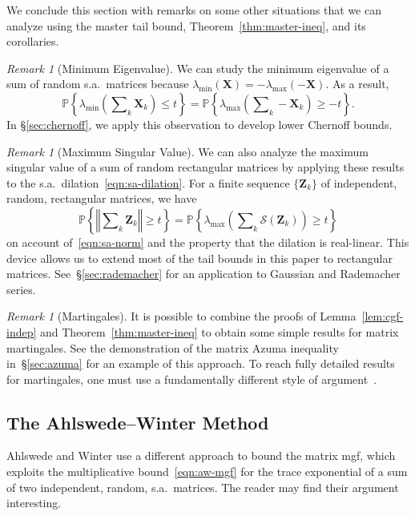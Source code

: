 \documentclass[11pt,letterpaper,twoside,reqno,draft]{amsart}
\theoremstyle{remark}
\newtheorem{rem}[thm]{Remark}
\numberwithin{equation}{section}
\numberwithin{thm}{section}
\begin{document}
We conclude this section with remarks on some other situations that we can analyze using the master tail bound, Theorem~\ref{thm:master-ineq}, and its corollaries.

\begin{rem}[Minimum Eigenvalue]
We can study the minimum eigenvalue of a sum of random s.a.~matrices because
$
\lambda_{\min}({\bm{{X}}})
	= - \lambda_{\max}(-{\bm{{X}}}).
$
As a result,
$$
{\mathbb{P}\left\{ {{ \lambda_{\min}\left(\sum\nolimits_k {\bm{{X}}}_k \right) \leq t }} \right\}}
	= {\mathbb{P}\left\{ {{ \lambda_{\max}\left(\sum\nolimits_k -{\bm{{X}}}_k \right) \geq -t }} \right\}}.
$$
In \S\ref{sec:chernoff}, we apply this observation to develop lower Chernoff bounds.
\end{rem}

\begin{rem}[Maximum Singular Value] \label{rem:max-sing}
We can also analyze the maximum singular value of a sum of random rectangular matrices by applying these results to the s.a.~dilation~\eqref{eqn:sa-dilation}.  For a finite sequence $\{{\bm{{Z}}}_k\}$ of independent, random, rectangular matrices, we have
$$
{\mathbb{P}\left\{ {{ {\left\Vert {{ \sum\nolimits_k {\bm{{Z}}}_k }} \right\Vert} \geq t }} \right\}}
	= {\mathbb{P}\left\{ {{ \lambda_{\max}\left(\sum\nolimits_k {\mathscr{{S}}}({\bm{{Z}}}_k) \right) \geq t }} \right\}}
$$
on account of~\eqref{eqn:sa-norm} and the property that the dilation is real-linear.
This device allows us to extend most of the tail bounds in this paper to rectangular matrices.  See~\S\ref{sec:rademacher} for an application to Gaussian and Rademacher series.
\end{rem}

\begin{rem}[Martingales]
It is possible to combine the proofs of Lemma~\ref{lem:cgf-indep} and Theorem~\ref{thm:master-ineq} to obtain some simple results for matrix martingales.  See the demonstration of the matrix Azuma inequality in~\S\ref{sec:azuma} for an example of this approach.  To reach fully detailed results for martingales, one must use a fundamentally different style of argument~\cite{Oli10:Concentration-Adjacency,Tro11:Freedmans-Inequality}.
\end{rem}

\subsection{The Ahlswede--Winter Method} \label{sec:aw}

Ahlswede and Winter use a different approach to bound the matrix mgf, which exploits the multiplicative bound~\eqref{eqn:aw-mgf} for the trace exponential of a sum of two independent, random, s.a.~matrices.  The reader may find their argument interesting.
\end{document}

